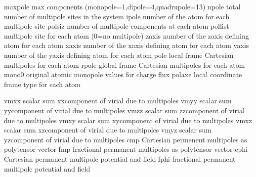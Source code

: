 \documentclass[letterpaper,11pt,english]{sphinxmanual}
\begin{document}
\sphinxAtStartPar
{}

\begin{sphinxVerbatim}[commandchars=\\\{\}]
maxpole         max components (monopole=1,dipole=4,quadrupole=13)
npole           total number of multipole sites in the system
ipole           number of the atom for each multipole site
polsiz          number of multipole components at each atom
pollist         multipole site for each atom (0=no multipole)
zaxis           number of the z\PYGZhy{}axis defining atom for each atom
xaxis           number of the x\PYGZhy{}axis defining atom for each atom
yaxis           number of the y\PYGZhy{}axis defining atom for each atom
pole            local frame Cartesian multipoles for each atom
rpole           global frame Cartesian multipoles for each atom
mono0           original atomic monopole values for charge flux
polaxe          local coordinate frame type for each atom
\end{sphinxVerbatim}

\sphinxAtStartPar
{}

\begin{sphinxVerbatim}[commandchars=\\\{\}]
vmxx            scalar sum xx\PYGZhy{}component of virial due to multipoles
vmyy            scalar sum yy\PYGZhy{}component of virial due to multipoles
vmzz            scalar sum zz\PYGZhy{}component of virial due to multipoles
vmxy            scalar sum xy\PYGZhy{}component of virial due to multipoles
vmxz            scalar sum xz\PYGZhy{}component of virial due to multipoles
vmyz            scalar sum yz\PYGZhy{}component of virial due to multipoles
cmp             Cartesian permenent multipoles as polytensor vector
fmp             fractional permanent multipoles as polytensor vector
cphi            Cartesian permanent multipole potential and field
fphi            fractional permanent multipole potential and field
\end{sphinxVerbatim}

\sphinxAtStartPar
{}
\end{document}
